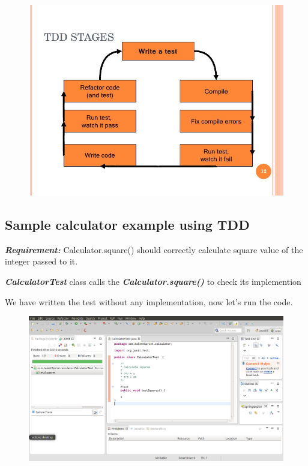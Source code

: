 \documentclass[11pt,a4paper]{article}
\begin{document}
\begin{figure}[H]
\begin{center}
\includegraphics[scale=0.45]{test-driven-development-stages.jpg}
\end{center}
\end{figure}

\subsection*{Sample calculator example using TDD}

\emph{\textbf{Requirement:}} Calculator.square() should correctly calculate square value of the integer passed to it.

\emph{\textbf{CalculatorTest}} class calls the \emph{\textbf{Calculator.square()}} to check its implemention



We have written the test without any implementation, now let's run the code.
\begin{figure}[H]
\begin{center}
\includegraphics[scale=0.30]{CalculatorTest-1.png}
\end{center}
\end{figure}
\end{document}
